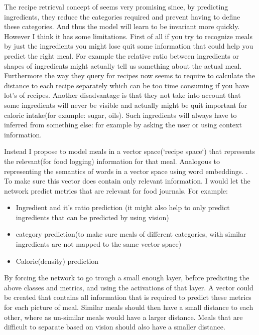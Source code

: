 \documentclass[a4paper]{scrartcl}
\begin{document}
The recipe retrieval concept of \cite{chen2016deep} seems very promising since, by predicting ingredients, they reduce the categories required and prevent having to define these categories. And thus the model will learn to be invariant more quickly. However I think it has some limitations. First of all if you try to recognize meals by just the ingredients you might lose quit some information that could help you predict the right meal. For example the relative ratio between ingredients or shapes of ingredients might actually tell us something about the actual meal. Furthermore the way they query for recipes now seems to require to calculate the distance to each recipe separately which can be too time consuming if you have lot's of recipes. Another disadvantage is that they not take into account that some ingredients will never be visible and actually might be quit important for caloric intake(for example: sugar, oils). Such ingredients will always have to inferred from something else: for example by asking the user or using context information.

Instead I propose to model meals in a vector space(`recipe space`) that represents the relevant(for food logging) information for that meal. Analogous to representing the semantics of words in a vector space using word embeddings. . To make sure this vector does contain only relevant information. I would let the network predict metrics that are relevant for food journals. For example:
\begin{itemize}
    \item Ingredient and it's ratio prediction (it might also help to only predict ingredients that can be predicted by using vision)
    \item category prediction(to make sure meals of different categories, with similar ingredients are not mapped to the same vector space) 
    \item Calorie(density) prediction
\end{itemize}

By forcing the network to go trough a small enough layer, before predicting the above classes and metrics, and using the activations of that layer. A vector  could be created that contains all information that is required to predict these metrics for each picture of meal. Similar meals should then have a small distance to each other, where as un-similar meals would have a larger distance. Meals that are difficult to separate based on vision should also have a smaller distance. 
\end{document}
